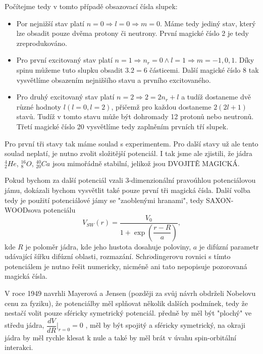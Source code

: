 \documentclass[../../main.tex]{subfiles}
\begin{document}
Počítejme tedy v tomto případě obsazovací čísla slupek:
\begin{itemize}
	\item Por nejnižší stav platí $n=0 \Rightarrow l =0 \Rightarrow m=0$. Máme tedy jediný stav, který lze obsadit pouze dvěma protony či neutrony. První magické číslo 2 je tedy zreprodukováno.
	
	\item Pro první excitovaný stav platí $n=1 \Rightarrow n_r = 0 \wedge l =1 \Rightarrow m = -1, 0, 1$. Díky spinu můžeme tuto slupku obsadit $3.2 = 6$ částicemi. Další magické číslo 8 tak vysvětlíme obsazením nejnižšího stavu a prvního excitovaného.
	
	\item Pro druhý excitovaný stav platí $n =2 \Rightarrow 2 = 2n_r + l$ a tudíž dostaneme dvě různé hodnoty $l (l =0, l=2)$, přičemž pro každou dostaneme $2(2l +1)$ stavů. Tudíž v tomto stavu může být dohromady 12 protonů nebo neutronů. Třetí magické číslo 20 vysvětlíme tedy zaplněním prvních tří slupek. 
\end{itemize}

Pro první tři stavy tak máme soulad s experimentem. Pro další stavy už ale tento soulad neplatí, je nutno zvolit složitější potenciál. I tak jsme ale zjistili, že jádra $^{4}_{2}He$, $^{16}_{8}O$, $^{40}_{20}Ca$ jsou mimořádně stabilní, jelikož jsou DVOJITĚ MAGICKÁ.

Pokud bychom za další potenciál vzali 3-dimenzionální pravoúhlou potenciálovou jámu, dokázali bychom vysvětlit také pouze první tři magická čísla. Další volba tedy je použití potenciálové jámy se "zaoblenými hranami", tedy SAXON-WOODsova potenciálu
\begin{equation}
	V_{SW}(r) = \dfrac{V_0}{1 + \exp \left(\dfrac{r-R}{a} \right )},
\end{equation}	
kde $R$ je poloměr jádra, kde jeho hustota dosahuje poloviny, $a$ je difúzní parametr udávající šířku difúzní oblasti, rozmazání. Schr$\ddot{o}$dingerovu rovnici s tímto potenciálem je nutno řešit numericky, nicméně ani tato nepopisuje pozorovaná magická čísla.

V roce 1949 navrhli Mayerová a Jensen (později za svůj návrh obdrželi Nobelovu cenu za fyziku), že potenciálby měl splňovat několik dalších podmínek, tedy že nestačí volit pouze sféricky symetrický potenciál. předně by měl být "plochý" ve středu jádra, $\dfrac{dV}{dR} |_{r=0} = 0$ , měl by být spojitý a sféricky symetrický, na okraji jádra by měl rychle klesat k nule a také by měl brát v úvahu spin-orbitální interakci. 
\end{document}
